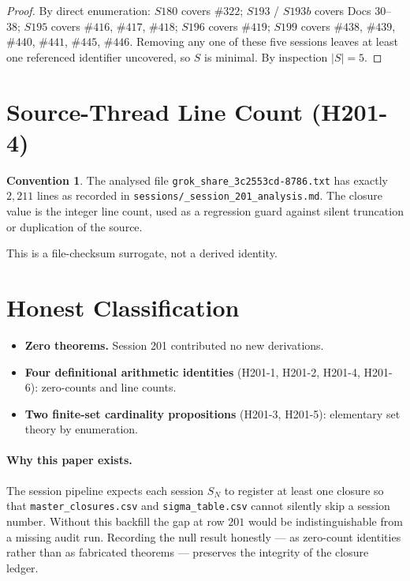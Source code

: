 \documentclass[11pt,letterpaper]{article}
\theoremstyle{definition}
\newtheorem{convention}[theorem]{Convention}
\begin{document}
\begin{proof}
By direct enumeration: $S180$ covers $\#322$; $S193$ / $S193b$ covers
Docs 30--38; $S195$ covers $\#416$, $\#417$, $\#418$; $S196$ covers
$\#419$; $S199$ covers $\#438$, $\#439$, $\#440$, $\#441$, $\#445$,
$\#446$. Removing any one of these five sessions leaves at least one
referenced identifier uncovered, so $S$ is minimal. By inspection
$|S| = 5$.
\end{proof}

\section{Source-Thread Line Count (H201-4)}

\begin{convention}\label{conv:linecount}
The analysed file \texttt{grok\_share\_3c2553cd-8786.txt} has exactly
$2{,}211$ lines as recorded in
\texttt{sessions/\_session\_201\_analysis.md}. The closure value is the
integer line count, used as a regression guard against silent
truncation or duplication of the source.
\end{convention}

This is a file-checksum surrogate, not a derived identity.

\section{Honest Classification}

\begin{itemize}
\item \textbf{Zero theorems.} Session 201 contributed no new derivations.
\item \textbf{Four definitional arithmetic identities} (H201-1, H201-2,
      H201-4, H201-6): zero-counts and line counts.
\item \textbf{Two finite-set cardinality propositions} (H201-3, H201-5):
      elementary set theory by enumeration.
\end{itemize}

\paragraph{Why this paper exists.} The session pipeline expects each
session $S_N$ to register at least one closure so that
\texttt{master\_closures.csv} and \texttt{sigma\_table.csv} cannot
silently skip a session number. Without this backfill the gap at row
$201$ would be indistinguishable from a missing audit run. Recording the
null result honestly --- as zero-count identities rather than as
fabricated theorems --- preserves the integrity of the closure ledger.
\end{document}
